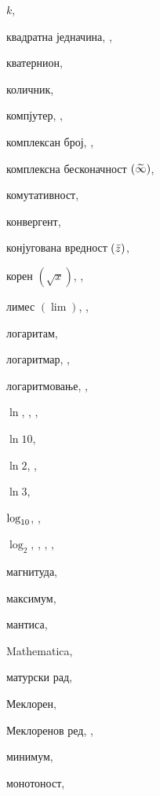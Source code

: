 \begin{theindex}
  \indexspace

  \item $k$, 
  \item квадратна једначина, , 
  \item кватернион, 
  \item количник, 
  \item компјутер, , 
  \item комплексан број, , 
  \item комплексна бесконачност $({\,\widetilde{\!\infty\!}\,})$, 
  \item комутативност, 
  \item конвергент, 
  \item конјугована вредност $({\bar z})$, 
  \item корен $(\sqrt x)$, , 

  \indexspace

  \item лимес $(\lim)$, , 
  \item логаритам, 
  \item логаритмар, , 
  \item логаритмовање, , 
  \interskip
  \item $\ln$, , , 
  \item $\ln 10$, 
  \item $\ln 2$, , 
  \item $\ln3$, 
  \item $\log_{10}$, , 
  \item $\log_2$, , , , 

  \indexspace

  \item магнитуда, 
  \item максимум, 
  \item мантиса, 
  \item Mathematica, 
  \item матурски рад, 
  \item Меклорен, 
  \item Меклоренов ред, , 
  \item минимум, 
  \item монотоност, 


\end{theindex}
